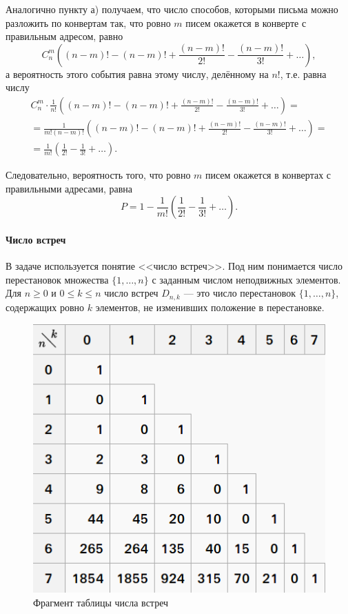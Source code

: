 \documentclass{book}
\begin{document}
Аналогично пункту а) получаем, что число способов, которыми письма можно разложить по конвертам так, что ровно $m$ писем окажется в конверте с правильным адресом, равно
$$C_n^m
\left( \left( n-m \right)! - \left( n-m \right)! + \frac{ \left(n-m \right)!}{2!} - \frac{ \left( n-m\right)!}{3!} + \dotsc \right),$$
а вероятность этого события равна этому числу, делённому на $n!$, т.е. равна числу
\begin{equation*}
\begin{split}
C_n^m \cdot \frac{1}{n!}
\left( \left( n-m \right)! - \left( n-m \right)! + \frac{ \left(n-m \right)!}{2!} - \frac{ \left( n-m\right)!}{3!} + \dotsc \right) = \\
= \frac{1}{m! \left( n-m \right)!}
\left( \left( n-m \right)! - \left( n-m \right)! + \frac{ \left(n-m \right)!}{2!} - \frac{ \left( n-m\right)!}{3!} + \dotsc \right) = \\
= \frac{1}{m!} \left( \frac{1}{2!} - \frac{1}{3!} + \dotsc \right).
\end{split}
\end{equation*}

Следовательно, вероятность того, что ровно $m$ писем окажется в конвертах с правильными адресами, равна
$$P =
1 - \frac{1}{m!} \left( \frac{1}{2!} - \frac{1}{3!} + \dotsc \right).$$

\paragraph*{Число встреч}

В задаче используется понятие <<число встреч>>.
Под ним понимается число перестановок множества $\{ 1, \dotsc, n \}$ с заданным числом неподвижных элементов.
Для $n \geq 0$ и $0 \leq k \leq n$ число встреч $D_{n, k}$ --- это число перестановок $\{ 1, \dotsc, n \}$,
содержащих ровно $k$ элементов, не изменивших положение в перестановке.

\begin{figure}[h!]
  \centering
  \includegraphics[width=.7\textwidth]{./pictures/3_12.png}
  \caption{Фрагмент таблицы числа встреч}
  \label{fig:312}
\end{figure}
\end{document}
